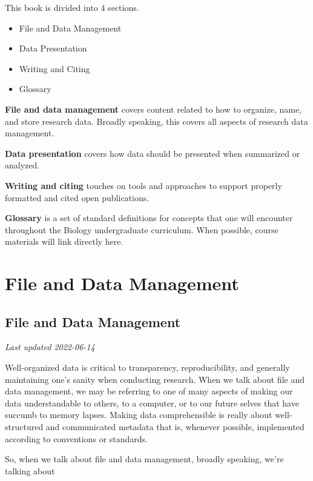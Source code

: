 \documentclass[
]{book}
\providecommand{\tightlist}{%
  \setlength{\itemsep}{0pt}\setlength{\parskip}{0pt}}
\begin{document}
This book is divided into 4 sections.

\begin{itemize}
\tightlist
\item
  File and Data Management
\item
  Data Presentation
\item
  Writing and Citing
\item
  Glossary
\end{itemize}

\textbf{File and data management} covers content related to how to organize, name, and store research data. Broadly speaking, this covers all aspects of research data management.

\textbf{Data presentation} covers how data should be presented when summarized or analyzed.

\textbf{Writing and citing} touches on tools and approaches to support properly formatted and cited open publications.

\textbf{Glossary} is a set of standard definitions for concepts that one will encounter throughout the Biology undergraduate curriculum. When possible, course materials will link directly here.

\hypertarget{part-file-and-data-management}{%
\part*{File and Data Management}\label{part-file-and-data-management}}

\hypertarget{file-and-data-management}{%
\chapter{File and Data Management}\label{file-and-data-management}}

\emph{Last updated 2022-06-14}

Well-organized data is critical to transparency, reproducibility, and generally maintaining one's sanity when conducting research. When we talk about file and data management, we may be referring to one of many aspects of making our data understandable to others, to a computer, or to our future selves that have succumb to memory lapses. Making data comprehensible is really about well-structured and communicated metadata that is, whenever possible, implemented according to conventions or standards.

So, when we talk about file and data management, broadly speaking, we're talking about
\end{document}
